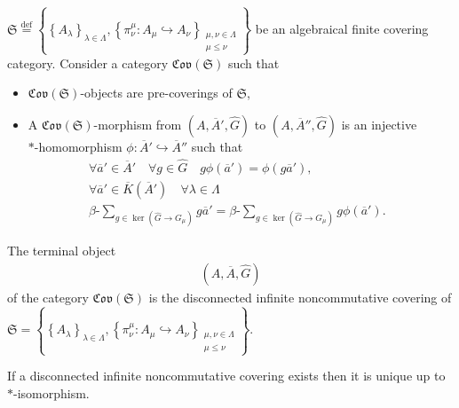 \documentclass{beamer}
\theoremstyle{plain}
\newcommand{\la}{\lambda}
\newcommand{\La}{\Lambda}
\newcommand{\bt}{\beta}           %
\newcommand{\bean}{\begin{eqnarray*}}
\newcommand{\eean}{\end{eqnarray*}}
\newcommand{\bydef}{\stackrel{\mathrm{def}}{=}}
\newcommand{\hookto}{\hookrightarrow}        %
\begin{document}
\begin{frame}
$\mathfrak{S}\bydef\left\{\left\{A_\la\right\}_{\la\in \La}, \left\{\pi^\mu_\nu : A_\mu \hookto A_\nu\right\}_{\substack{\mu, \nu \in \La\\\mu \le \nu}}\right\}$ be an algebraical finite covering category. Consider a category $\mathfrak{Cov}\left(\mathfrak{S} \right)$ such that
\begin{itemize}
	\item $\mathfrak{Cov}\left(\mathfrak{S} \right)$-objects are pre-coverings of $\mathfrak{S}$,
	\item A $\mathfrak{Cov}\left(\mathfrak{S} \right)$-morphism from $\left(A, \overline A', \widehat{G}\right)$ to  $\left( A, \overline A'', \widehat{G}\right)$ is an injective \\$*$-homomorphism $\phi: \overline A' \hookto  \overline A''$  such that
	\bean
	\forall	\overline a' \in \overline A'\quad \forall g \in \widehat{G}\quad g\phi\left( \overline a'\right) = \phi\left(g \overline a'\right),~~~\\
	\label{infinite_covering_eqn}\forall	\overline a' \in \overline K\left(\overline A'\right) \quad \forall \la\in \La \\ \bt\text{-} \sum_{	g \in \ker\left( \widehat{G}\to G_\mu\right) }g \overline a'= \bt\text{-} \sum_{	g \in \ker\left( \widehat{G}\to G_\mu\right) }g \phi\left( \overline a'\right).~~~ 
	\eean
\end{itemize} 
\end{frame}
\begin{frame}
\begin{definition}\label{disconnected_infinite_noncommutative_covering_defn}
	The terminal object 	\bean\label{disconnected_infinite_noncommutative_covering_eqn}
	\left(A, \overline{A},  \widehat{G}\right)
	\eean
 of the category $\mathfrak{Cov}\left(\mathfrak{S} \right)$ is the  \alert{disconnected infinite noncommutative covering} of $\mathfrak{S}=\left\{\left\{A_\la\right\}_{\la\in \La}, \left\{\pi^\mu_\nu : A_\mu \hookto A_\nu\right\}_{\substack{\mu, \nu \in \La\\\mu \le \nu}}\right\}$. 
\end{definition}
\begin{lemma}\label{uni_dicsonnected_lem}
	If a disconnected infinite noncommutative covering exists then it is unique up to $*$-isomorphism. 
\end{lemma}
\end{frame}
\end{document}
